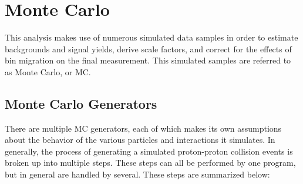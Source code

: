 \section{Monte Carlo}
\label{sec:mc}

This analysis makes use of numerous simulated data samples in order to estimate
backgrounds and signal yields, derive scale factors, and correct for the
effects of bin migration on the final measurement. This simulated samples are
referred to as Monte Carlo, or MC.

\subsection{Monte Carlo Generators}
\label{ssec:mc_generators}

There are multiple MC generators, each of which makes its own assumptions about
the behavior of the various particles and interactions it simulates. In
generally, the process of generating a simulated proton-proton collision
events is broken up into multiple steps. These steps can all be performed by one
program, but in general are handled by several. These steps are summarized
below:


